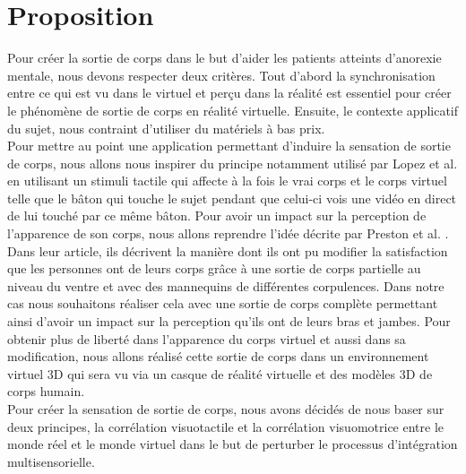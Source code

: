 \section{Proposition}
Pour créer la sortie de corps dans le but d'aider les patients atteints d'anorexie mentale, nous devons respecter deux critères. Tout d'abord la synchronisation entre ce qui est vu dans le virtuel et perçu dans la réalité est essentiel pour créer le phénomène de sortie de corps en réalité virtuelle. Ensuite, le contexte applicatif du sujet, nous contraint d'utiliser du matériels à bas prix.\\

Pour mettre au point une application permettant d'induire la sensation de sortie de corps, nous allons nous inspirer du principe notamment utilisé par Lopez et al. \cite{bl10} en utilisant un stimuli tactile qui affecte à la fois le vrai corps et le corps virtuel telle que le bâton qui touche le sujet pendant que celui-ci vois une vidéo en direct de lui touché par ce même bâton. Pour avoir un impact sur la perception de l'apparence de son corps, nous allons reprendre l'idée décrite par Preston et al. \cite{pr14}. Dans leur article, ils décrivent la manière dont ils ont pu modifier la satisfaction que les personnes ont de leurs corps grâce à une sortie de corps partielle au niveau du ventre et avec des mannequins de différentes corpulences. Dans notre cas nous souhaitons réaliser cela avec une sortie de corps complète permettant ainsi d'avoir un impact sur la perception qu'ils ont de leurs bras et jambes. Pour obtenir plus de liberté dans l'apparence du corps virtuel et aussi dans sa modification, nous allons réalisé cette sortie de corps dans un environnement virtuel 3D qui sera vu via un casque de réalité virtuelle et des modèles 3D de corps humain.\\

Pour créer la sensation de sortie de corps, nous avons décidés de nous baser sur deux principes, la corrélation visuotactile et la corrélation visuomotrice entre le monde réel et le monde virtuel dans le but de perturber le processus d'intégration multisensorielle.\\

